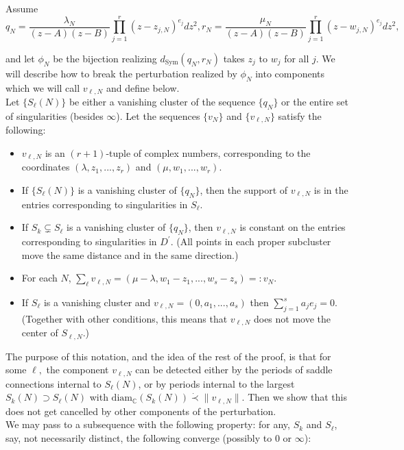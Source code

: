 \documentclass[12pt]{article}
\newcommand{\cc}{\mathbb{C}}
\newcommand{\diam}{\mathrm{diam}}
\begin{document}
Assume $$q_N = \frac{\lambda_N}{(z-A)(z-B)}\prod_{j = 1}^r (z-z_{j,N})^{e_j}dz^2, r_N = \frac{\mu_N}{(z-A)(z-B)}\prod_{j = 1}^r (z-w_{j,N})^{e_j}dz^2,$$

\noindent and let $\phi_N$ be the bijection realizing $d_\mathrm{Sym}(q_N,r_N)$ takes $z_j$ to $w_j$ for all $j$. We will describe how to break the perturbation realized by $\phi_N$ into components which we will call $v_{\ell,N}$ and define below.\\

\noindent Let $\{S_\ell(N)\}$ be either a vanishing cluster of the sequence $\{q_N\}$ or the entire set of singularities (besides $\infty$). Let the sequences $\{v_N\}$ and $\{v_{\ell,N}\}$ satisfy the following:\\

\begin{itemize}
\item $v_{\ell,N}$ is an $(r+1)$-tuple of complex numbers, corresponding to the coordinates $(\lambda,z_1,...,z_r)$ and $(\mu,w_1,...,w_r)$.
\item If $\{S_\ell(N)\}$ is a vanishing cluster of $\{q_N\}$, then the support of $v_{\ell,N}$ is in the entries corresponding to singularities in $S_\ell$.
\item If $S_k \subsetneq S_\ell$ is a vanishing cluster of $\{q_N\}$, then $v_{\ell,N}$ is constant on the entries corresponding to singularities in $D^\prime$. (All points in each proper subcluster move the same distance and in the same direction.)
\item For each $N$, $\sum\limits_{\ell} v_{\ell,N} = (\mu - \lambda, w_1 - z_1,...,w_s - z_s) =: v_N$.
\item If $S_\ell$ is a vanishing cluster and $v_{\ell,N} = (0,a_1,...,a_s)$ then $\sum\limits_{j = 1}^s a_je_j = 0$. (Together with other conditions, this means that $v_{\ell,N}$ does not move the center of $S_{\ell,N}$.)
\end{itemize}

\noindent The purpose of this notation, and the idea of the rest of the proof, is that for some $\ell,$ the component $v_{\ell,N}$ can be detected either by the periods of saddle connections internal to $S_\ell(N)$, or by periods internal to the largest $S_k(N) \supset S_\ell(N)$ with $\diam_\cc(S_k(N)) \dot{\prec} \|v_{\ell,N}\|$. Then we show that this does not get cancelled by other components of the perturbation.\\

\noindent We may pass to a subsequence with the following property: for any, $S_k$ and $S_\ell$, say, not necessarily distinct, the following converge (possibly to $0$ or $\infty$):
\end{document}
